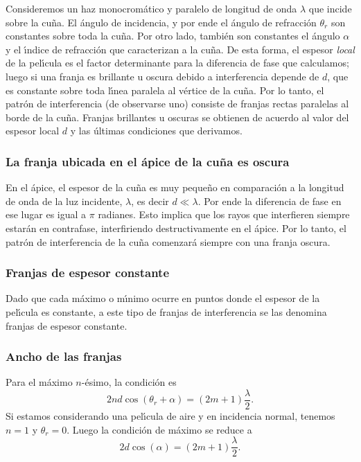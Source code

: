 \documentclass[a4paper]{article}
\begin{document}
Consideremos un haz monocrom\'atico y paralelo de longitud de onda $\lambda$
que incide sobre la cu\~na. El \'angulo de incidencia, y por ende el \'angulo
de refracci\'on $\theta_r$ son constantes sobre toda la cu\~na. Por otro lado,
tambi\'en son constantes el \'angulo $\alpha$ y el \'\i ndice de refracci\'on
que caracterizan a la cu\~na. De esta forma, el espesor {\it local} de la 
pel\'\i cula es el factor determinante para la diferencia de fase que
calculamos; luego si una franja es brillante u oscura debido a interferencia
depende de $d$, que es constante sobre toda l\'\i nea paralela al v\'ertice
de la cu\~na. Por lo tanto, el patr\'on de interferencia (de observarse uno)
consiste de franjas rectas paralelas al borde de la cu\~na. Franjas brillantes
u oscuras se obtienen de acuerdo al valor del espesor local $d$ y las \'ultimas
condiciones que derivamos.

\subsubsection{La franja ubicada en el \'apice de la cu\~na es oscura}

En el \'apice, el espesor de la cu\~na es muy peque\~no en comparaci\'on a
la longitud de onda de la luz incidente, $\lambda$, es decir $d \ll \lambda$.
Por ende la diferencia de fase en ese lugar es igual a $\pi$ radianes. Esto
implica que los rayos que interfieren siempre estar\'an en contrafase, 
interfiriendo destructivamente en el \'apice. Por lo tanto, el patr\'on de
interferencia de la cu\~na comenzar\'a siempre con una franja oscura.

\subsubsection{Franjas de espesor constante}

Dado que cada m\'aximo o m\'\i nimo ocurre en puntos donde el espesor de la
pel\'\i cula es constante, a este tipo de franjas de interferencia se las
denomina franjas de espesor constante.

\subsubsection{Ancho de las franjas}

Para el m\'aximo $n$-\'esimo, la condici\'on es
\begin{equation}
    2 n d \cos \left( \theta_r + \alpha \right) = \left( 2 m + 1 \right) 
    \frac{\lambda}{2}.
\end{equation}
Si estamos considerando una pel\'\i cula de aire y en incidencia normal,
tenemos $n = 1$ y $\theta_r = 0$. Luego la condici\'on de m\'aximo se 
reduce a
\begin{equation}
    2 d \cos \left( \alpha \right) = \left( 2 m + 1 \right) 
    \frac{\lambda}{2}.
\end{equation}
\end{document}
